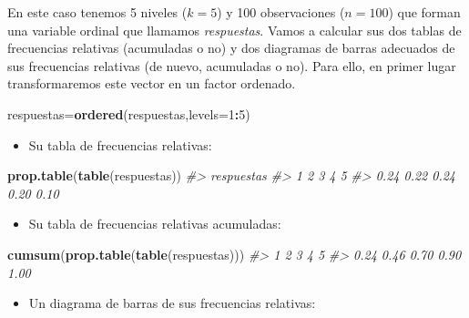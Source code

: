 \documentclass[
]{book}
\newenvironment{Shaded}{\begin{snugshade}}{\end{snugshade}}
\newcommand{\CommentTok}[1]{\textcolor[rgb]{0.56,0.35,0.01}{\textit{#1}}}
\newcommand{\DataTypeTok}[1]{\textcolor[rgb]{0.13,0.29,0.53}{#1}}
\newcommand{\DecValTok}[1]{\textcolor[rgb]{0.00,0.00,0.81}{#1}}
\newcommand{\KeywordTok}[1]{\textcolor[rgb]{0.13,0.29,0.53}{\textbf{#1}}}
\newcommand{\NormalTok}[1]{#1}
\newcommand{\OperatorTok}[1]{\textcolor[rgb]{0.81,0.36,0.00}{\textbf{#1}}}
\providecommand{\tightlist}{%
  \setlength{\itemsep}{0pt}\setlength{\parskip}{0pt}}
\theoremstyle{definition}
\theoremstyle{definition}
\theoremstyle{definition}
\theoremstyle{remark}
\begin{document}
En este caso tenemos 5 niveles (\(k=5\)) y 100 observaciones (\(n=100\)) que forman una variable ordinal que llamamos \emph{respuestas}. Vamos a calcular sus dos tablas de frecuencias relativas (acumuladas o no) y dos diagramas de barras adecuados de sus frecuencias relativas (de nuevo, acumuladas o no). Para ello, en primer lugar transformaremos este vector en un factor ordenado.

\begin{Shaded}
\begin{Highlighting}[]
\NormalTok{respuestas=}\KeywordTok{ordered}\NormalTok{(respuestas,}\DataTypeTok{levels=}\DecValTok{1}\OperatorTok{:}\DecValTok{5}\NormalTok{)}
\end{Highlighting}
\end{Shaded}

\begin{itemize}
\tightlist
\item
  Su tabla de frecuencias relativas:
\end{itemize}

\begin{Shaded}
\begin{Highlighting}[]
\KeywordTok{prop.table}\NormalTok{(}\KeywordTok{table}\NormalTok{(respuestas))}
\CommentTok{\#\textgreater{} respuestas}
\CommentTok{\#\textgreater{}    1    2    3    4    5 }
\CommentTok{\#\textgreater{} 0.24 0.22 0.24 0.20 0.10}
\end{Highlighting}
\end{Shaded}

\begin{itemize}
\tightlist
\item
  Su tabla de frecuencias relativas acumuladas:
\end{itemize}

\begin{Shaded}
\begin{Highlighting}[]
\KeywordTok{cumsum}\NormalTok{(}\KeywordTok{prop.table}\NormalTok{(}\KeywordTok{table}\NormalTok{(respuestas)))}
\CommentTok{\#\textgreater{}    1    2    3    4    5 }
\CommentTok{\#\textgreater{} 0.24 0.46 0.70 0.90 1.00}
\end{Highlighting}
\end{Shaded}

\begin{itemize}
\tightlist
\item
  Un diagrama de barras de sus frecuencias relativas:
\end{itemize}
\end{document}

